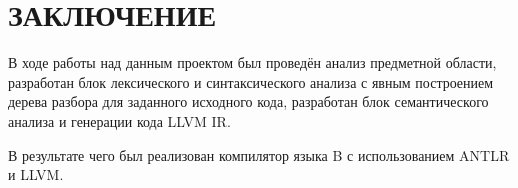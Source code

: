 \chapter*{\textbf{ЗАКЛЮЧЕНИЕ}}

В ходе работы над данным проектом был проведён анализ предметной области, разработан блок лексического и синтаксического анализа с явным построением дерева разбора для заданного исходного кода, разработан блок семантического анализа и генерации кода LLVM IR.

В результате чего был реализован компилятор языка B с использованием ANTLR и LLVM.